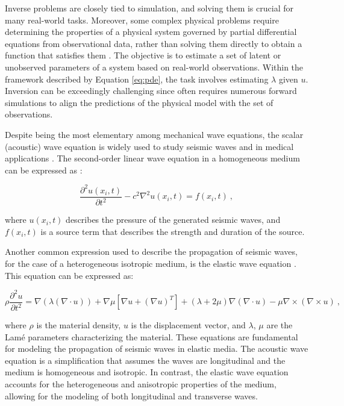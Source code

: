 \documentclass[11pt,twoside]{article}
\begin{document}
Inverse problems are closely tied to simulation, and solving them is crucial for many real-world tasks. Moreover, some complex 
physical problems require determining the properties of a physical system governed by partial differential equations from 
observational data, rather than solving them directly to obtain a function that satisfies them 
\citep{galiounas_battery_2022, ren_seismicnet_2024,mccann_convolutional_2017}. The objective is to estimate a set of latent or 
unobserved parameters of a system based on real-world observations. Within the framework described by Equation \ref{eq:pde}, 
the task involves estimating $\lambda$ given $u$. Inversion can be exceedingly challenging since often requires numerous forward 
simulations to align the predictions of the physical model with the set of observations. 

Despite being the most elementary among mechanical wave equations, the scalar (acoustic) wave equation is widely used to study 
seismic waves and in medical applications \citep{moseley_physics-informed_2022, alkhadhr_wave_2023}. The second-order linear 
wave equation in a homogeneous medium can be expressed as \citep{Carcione2002}:

\begin{equation*}
\frac{\partial^2 u(x_i, t)}{\partial t^2} - c^{2} \nabla^2 u(x_i, t) = f(x_i, t) \ ,
\label{acoustic}
\end{equation*}

where \( u(x_i, t) \) describes the pressure of the generated seismic waves, and \( f(x_i, t) \) is a source term that 
describes the strength and duration of the source.

Another common expression used to describe the propagation of seismic waves, for the case of a heterogeneous 
isotropic medium, is the elastic wave equation \citep{moseley_fast_2018, lehmann_fourier_2023}. This equation can 
be expressed as:

\begin{equation*}
\rho \frac{\partial^2 u}{\partial t^2} = \nabla (\lambda (\nabla \cdot u)) + \nabla \mu \left[\nabla u + (\nabla u)^T\right] 
+ (\lambda + 2\mu) \nabla (\nabla \cdot u) - \mu \nabla \times (\nabla \times u) \ ,
\label{elastic}
\end{equation*}

where $\rho$ is the material density, $u$ is the displacement vector, and $\lambda$, $\mu$ are the Lamé parameters 
characterizing the material. These equations are fundamental for modeling the propagation of seismic waves in 
elastic media. The acoustic wave equation is a simplification that assumes the waves are longitudinal and the 
medium is homogeneous and isotropic. In contrast, the elastic wave equation accounts for the heterogeneous 
and anisotropic properties of the medium, allowing for the modeling of both longitudinal and transverse waves.
\end{document}

